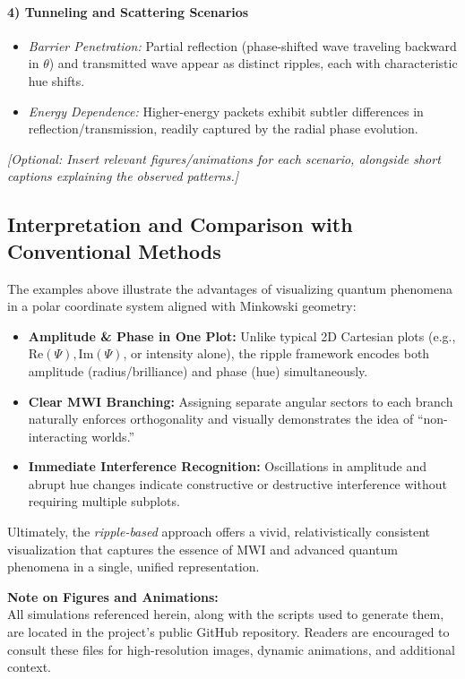\paragraph{4) Tunneling and Scattering Scenarios}
\begin{itemize}
    \item \textit{Barrier Penetration:} Partial reflection (phase-shifted wave traveling backward in \(\theta\)) and transmitted wave appear as distinct ripples, each with characteristic hue shifts.
    \item \textit{Energy Dependence:} Higher-energy packets exhibit subtler differences in reflection/transmission, readily captured by the radial phase evolution.
\end{itemize}

\noindent
\textit{[Optional: Insert relevant figures/animations for each scenario, alongside short captions explaining the observed patterns.]}


\subsection{Interpretation and Comparison with Conventional Methods}
The examples above illustrate the advantages of visualizing quantum phenomena in a polar coordinate system aligned with Minkowski geometry:
\begin{itemize}
    \item \textbf{Amplitude \& Phase in One Plot:} Unlike typical 2D Cartesian plots (e.g., \(\mathrm{Re}(\Psi), \mathrm{Im}(\Psi)\), or intensity alone), the ripple framework encodes both amplitude (radius/brilliance) and phase (hue) simultaneously.
    \item \textbf{Clear MWI Branching:} Assigning separate angular sectors to each branch naturally enforces orthogonality and visually demonstrates the idea of “non-interacting worlds.”
    \item \textbf{Immediate Interference Recognition:} Oscillations in amplitude and abrupt hue changes indicate constructive or destructive interference without requiring multiple subplots.
\end{itemize}

\noindent Ultimately, the \emph{ripple-based} approach offers a vivid, relativistically consistent visualization that captures the essence of MWI and advanced quantum phenomena in a single, unified representation.

\bigskip
\noindent
\textbf{Note on Figures and Animations:}\\
All simulations referenced herein, along with the scripts used to generate them, are located in the project’s public GitHub repository. Readers are encouraged to consult these files for high-resolution images, dynamic animations, and additional context.

\newpage

